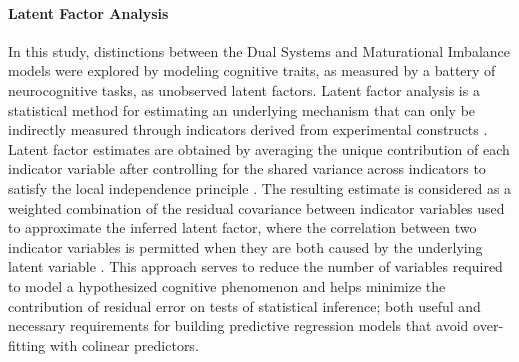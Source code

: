 \documentclass[utf8]{frontiersSCNS} %
\begin{document}
\paragraph*{Latent Factor Analysis} In this study, distinctions between the Dual Systems and Maturational Imbalance models were explored by modeling cognitive traits, as measured by a battery of neurocognitive tasks, as unobserved latent factors. Latent factor analysis is a statistical method for estimating an underlying mechanism that can only be indirectly measured through indicators derived from experimental constructs \citep{finch2015latent}. Latent factor estimates are obtained by averaging the unique contribution of each indicator variable after controlling for the shared variance across indicators to satisfy the local independence principle \citep{sobel1997measurement}. The resulting estimate is considered as a weighted combination of the residual covariance between indicator variables used to approximate the inferred latent factor, where the correlation between two indicator variables is permitted when they are both caused by the underlying latent variable \citep{cooper2019neuroimaging}. This approach serves to reduce the number of variables required to model a hypothesized cognitive phenomenon and helps minimize the contribution of residual error on tests of statistical inference; both useful and necessary requirements for building predictive regression models that avoid over-fitting with colinear predictors.
\end{document}
